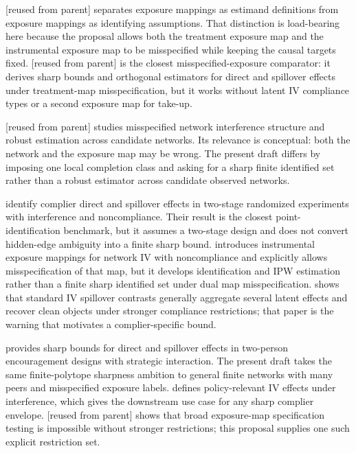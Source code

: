 \documentclass[11pt]{article}
\theoremstyle{definition}
\theoremstyle{plain}
\theoremstyle{remark}
\begin{document}
\citet{savje_2024_misspecified_exposure_mappings} [reused from parent] separates exposure mappings as estimand definitions from exposure mappings as identifying assumptions. That distinction is load-bearing here because the proposal allows both the treatment exposure map and the instrumental exposure map to be misspecified while keeping the causal targets fixed. \citet{schroder_oprescu_feuerriegel_kallus_2026_networks_partialid} [reused from parent] is the closest misspecified-exposure comparator: it derives sharp bounds and orthogonal estimators for direct and spillover effects under treatment-map misspecification, but it works without latent IV compliance types or a second exposure map for take-up.

\citet{weinstein_nevo_2026_misspecified_network} [reused from parent] studies misspecified network interference structure and robust estimation across candidate networks. Its relevance is conceptual: both the network and the exposure map may be wrong. The present draft differs by imposing one local completion class and asking for a sharp finite identified set rather than a robust estimator across candidate observed networks.

\citet{imai_jiang_malani_2021_interference_noncompliance} identify complier direct and spillover effects in two-stage randomized experiments with interference and noncompliance. Their result is the closest point-identification benchmark, but it assumes a two-stage design and does not convert hidden-edge ambiguity into a finite sharp bound. \citet{hoshino_yanagi_2024_noncompliance_unknown_interference} introduces instrumental exposure mappings for network IV with noncompliance and explicitly allows misspecification of that map, but it develops identification and IPW estimation rather than a finite sharp identified set under dual map misspecification. \citet{vazquez_bare_2023_iv_spillovers} shows that standard IV spillover contrasts generally aggregate several latent effects and recover clean objects under stronger compliance restrictions; that paper is the warning that motivates a complier-specific bound.

\citet{acerenza_martinez_iriarte_sanchez_becerra_spini_2025_household_bounds} provides sharp bounds for direct and spillover effects in two-person encouragement designs with strategic interaction. The present draft takes the same finite-polytope sharpness ambition to general finite networks with many peers and misspecified exposure labels. \citet{nibbering_oosterveen_2025_iv_interference_policy} defines policy-relevant IV effects under interference, which gives the downstream use case for any sharp complier envelope. \citet{gao_harshaw_savje_wang_2026_impossibility_testing} [reused from parent] shows that broad exposure-map specification testing is impossible without stronger restrictions; this proposal supplies one such explicit restriction set.
\end{document}
